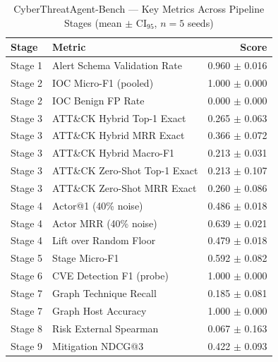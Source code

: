 \begin{table}[t]
\centering
\caption{CyberThreatAgent-Bench --- Key Metrics Across Pipeline Stages (mean $\pm$ CI$_{95}$, $n=5$ seeds)}
\label{tab:scorecard}
\begin{tabular}{llr}
\toprule
Stage & Metric & Score \\ \midrule
Stage 1 & Alert Schema Validation Rate & 0.960 $\pm$ 0.016 \\
Stage 2 & IOC Micro-F1 (pooled) & 1.000 $\pm$ 0.000 \\
Stage 2 & IOC Benign FP Rate & 0.000 $\pm$ 0.000 \\
Stage 3 & ATT\&CK Hybrid Top-1 Exact & 0.265 $\pm$ 0.063 \\
Stage 3 & ATT\&CK Hybrid MRR Exact & 0.366 $\pm$ 0.072 \\
Stage 3 & ATT\&CK Hybrid Macro-F1 & 0.213 $\pm$ 0.031 \\
Stage 3 & ATT\&CK Zero-Shot Top-1 Exact & 0.213 $\pm$ 0.107 \\
Stage 3 & ATT\&CK Zero-Shot MRR Exact & 0.260 $\pm$ 0.086 \\
Stage 4 & Actor@1 (40\% noise) & 0.486 $\pm$ 0.018 \\
Stage 4 & Actor MRR (40\% noise) & 0.639 $\pm$ 0.021 \\
Stage 4 & Lift over Random Floor & 0.479 $\pm$ 0.018 \\
Stage 5 & Stage Micro-F1 & 0.592 $\pm$ 0.082 \\
Stage 6 & CVE Detection F1 (probe) & 1.000 $\pm$ 0.000 \\
Stage 7 & Graph Technique Recall & 0.185 $\pm$ 0.081 \\
Stage 7 & Graph Host Accuracy & 1.000 $\pm$ 0.000 \\
Stage 8 & Risk External Spearman & 0.067 $\pm$ 0.163 \\
Stage 9 & Mitigation NDCG@3 & 0.422 $\pm$ 0.093 \\
\bottomrule
\end{tabular}
\end{table}